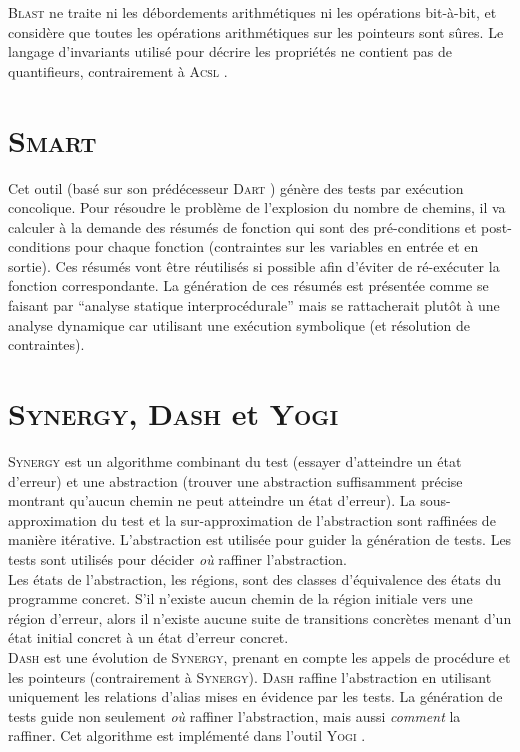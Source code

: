 \textsc{Blast} ne traite ni les débordements arithmétiques ni les opérations
bit-à-bit, et considère que toutes les opérations arithmétiques sur les
pointeurs sont sûres. Le langage d'invariants utilisé pour décrire les
propriétés ne contient pas de quantifieurs, contrairement à \textsc{Acsl}
\cite{ACSL}.

\section{\textsc{Smart}}

Cet outil \cite{SMART} (basé sur son prédécesseur \textsc{Dart} \cite{DART})
génère des tests par exécution concolique. Pour résoudre le problème de
l'explosion du nombre de chemins, il va calculer à la demande des résumés de
fonction qui sont des pré-conditions et post-conditions pour chaque fonction
(contraintes sur les variables en entrée et en sortie). Ces résumés vont être
réutilisés si possible afin d'éviter de ré-exécuter la fonction correspondante.
La génération de ces résumés est présentée comme se faisant par ``analyse
statique interprocédurale'' mais se rattacherait plutôt à une analyse dynamique
car utilisant une exécution symbolique (et résolution de contraintes).

\section{\textsc{Synergy}, \textsc{Dash} et \textsc{Yogi}}

\textsc{Synergy} \cite{SYNERGY} est un algorithme combinant du test (essayer
d'atteindre un état d'erreur) et une abstraction (trouver une abstraction
suffisamment précise montrant qu'aucun chemin ne peut atteindre un état
d'erreur). La sous-approximation du test et la sur-approximation de
l'abstraction sont raffinées de manière itérative. L'abstraction est utilisée
pour guider la génération de tests. Les tests sont utilisés pour décider
{\em où} raffiner l'abstraction.\\

Les états de l'abstraction, les régions, sont des classes d'équivalence des
états du programme concret. S'il n'existe aucun chemin de la région initiale
vers une région d'erreur, alors il n'existe aucune suite de transitions
concrètes menant d'un état initial concret à un état d'erreur concret.\\

\textsc{Dash} \cite{DASH} est une évolution de \textsc{Synergy}, prenant en
compte les appels de procédure et les pointeurs (contrairement à
\textsc{Synergy}). \textsc{Dash} raffine l'abstraction en utilisant uniquement
les relations d'alias mises en évidence par les tests. La génération de tests
guide non seulement {\em où} raffiner l'abstraction, mais aussi {\em comment}
la raffiner. Cet algorithme est implémenté dans l'outil \textsc{Yogi}
\cite{YOGI}.


